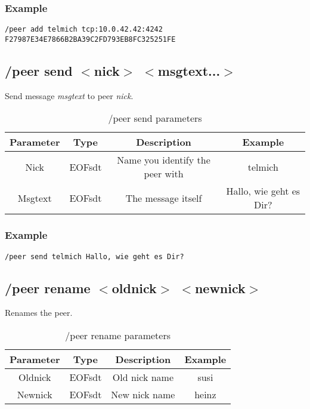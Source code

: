 \documentclass[12pt,a4paper]{book}
\begin{document}
\subsubsection{Example}
\begin{verbatim}
/peer add telmich tcp:10.0.42.42:4242 F27987E34E7866B2BA39C2FD793EB8FC325251FE
\end{verbatim}
\subsection{/peer send $<$nick$>$ $<$msgtext...$>$}
Send message \textit{msgtext} to peer \textit{nick}.

%
\begin{longtable}{|c|c|c|c|}
\caption{/peer send parameters}\\
\hline
\textbf{Parameter} & \textbf{Type} & \textbf{Description} & \textbf{Example}\\
\hline
Nick & EOFsdt & Name you identify the peer with & telmich\\
\hline
Msgtext & EOFsdt & The message itself & Hallo, wie geht es Dir?\\
\hline
\end{longtable}

\subsubsection{Example}
\begin{verbatim}
/peer send telmich Hallo, wie geht es Dir?
\end{verbatim}
\subsection{/peer rename $<$oldnick$>$ $<$newnick$>$}
Renames the peer.
%
\begin{longtable}{|c|c|c|c|}
\caption{/peer rename parameters}\\
\hline
\textbf{Parameter} & \textbf{Type} & \textbf{Description} & \textbf{Example}\\
\hline
Oldnick & EOFsdt & Old nick name & susi\\
\hline
Newnick & EOFsdt & New nick name & heinz\\
\hline
\end{longtable}
\end{document}
